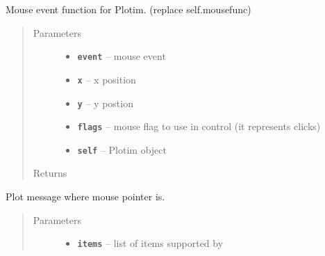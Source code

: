 \documentclass[letterpaper,10pt,english]{sphinxmanual}
\begin{document}
\begin{fulllineitems}
\begin{fulllineitems}
\begin{quote}
\begin{description}
\end{description}\end{quote}

\end{fulllineitems}


\begin{fulllineitems}
\label{RRtoolbox.lib:RRtoolbox.lib.plotter.Plotim.onmouse}
Mouse event function for Plotim. (replace self.mousefunc)
\begin{quote}\begin{description}
\item[{Parameters}] \leavevmode\begin{itemize}
\item {} 
\textbf{\texttt{event}} -- mouse event

\item {} 
\textbf{\texttt{x}} -- x position

\item {} 
\textbf{\texttt{y}} -- y postion

\item {} 
\textbf{\texttt{flags}} -- mouse flag to use in control (it represents clicks)

\item {} 
\textbf{\texttt{self}} -- Plotim object

\end{itemize}

\item[{Returns}] \leavevmode


\end{description}\end{quote}

\end{fulllineitems}


\begin{fulllineitems}
\label{RRtoolbox.lib:RRtoolbox.lib.plotter.Plotim.plotatpointer}
Plot message where mouse pointer is.
\begin{quote}\begin{description}
\item[{Parameters}] \leavevmode\begin{itemize}
\item {} 
\textbf{\texttt{items}} -- list of items supported by 


\end{itemize}
\end{description}
\end{quote}
\end{fulllineitems}
\end{fulllineitems}
\end{document}
